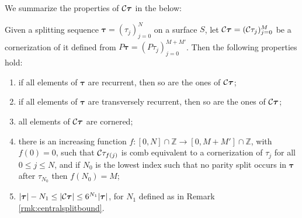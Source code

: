 We summarize the properties of ${\mathcal C}\bm\tau$ in the below:
\begin{lemma}\label{lem:ctauproperties}
Given a splitting sequence $\bm\tau=(\tau_j)_{j=0}^N$ on a surface $S$, let ${\mathcal C}\bm\tau=({\mathcal C}\tau_j)_{j=0}^M$ be a cornerization of it defined from $P\bm\tau=(P\tau_j)_{j=0}^{M+M'}$. Then the following properties hold:
\begin{enumerate}
\item if all elements of $\bm\tau$ are recurrent, then so are the ones of ${\mathcal C}\bm\tau$;
\item if all elements of $\bm\tau$ are transversely recurrent, then so are the ones of ${\mathcal C}\bm\tau$;
\item all elements of ${\mathcal C}\bm\tau$ are cornered;
\item there is an increasing function $f:[0,N]\cap\mathbb Z\rightarrow [0,M+M']\cap\mathbb Z$, with $f(0)=0$, such that ${\mathcal C}\tau_{f(j)}$ is comb equivalent to a cornerization of $\tau_j$ for all $0\leq j\leq N$, and if $N_0$ is the lowest index such that no parity split occurs in $\bm\tau$ after $\tau_{N_0}$ then $f(N_0)=M$;
\item $|\bm\tau|-N_1\leq|{\mathcal C}\bm\tau|\leq 6^{N_1}|\bm\tau|$, for $N_1$ defined as in Remark \ref{rmk:centralsplitbound}.
\end{enumerate}
\end{lemma}
